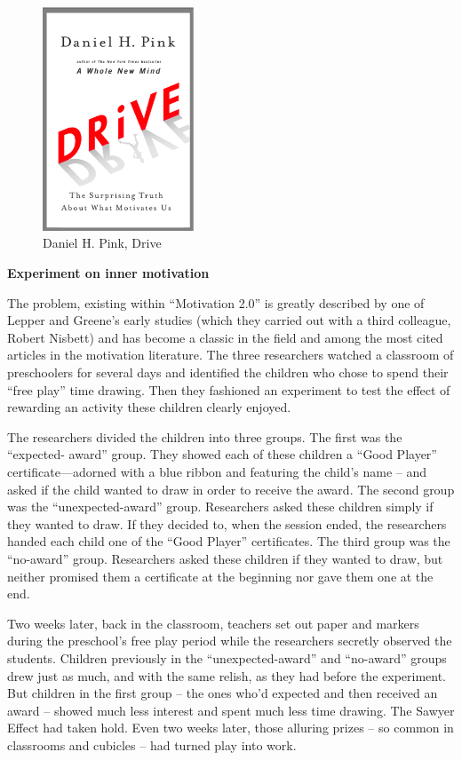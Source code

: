 \begin{figure}
    \centering
    \includegraphics[width=0.4\textwidth]{resources/drive.jpg}
    \caption[Daniel H. Pink, Drive]{Daniel H. Pink, Drive}
\end{figure}

\textbf{Experiment on inner motivation}

The problem, existing within ``Motivation 2.0'' is greatly described by one of Lepper and Greene’s early studies (which they carried out with a third colleague, Robert Nisbett) and has become a classic in the field and among the most cited articles in the motivation literature. The three researchers watched a classroom of preschoolers for several days and identified the children who chose to spend their ``free play'' time drawing. Then they fashioned an experiment to test the effect of rewarding an activity these children clearly enjoyed.

The researchers divided the children into three groups. The first was the ``expected- award'' group. They showed each of these children a ``Good Player'' certificate—adorned with a blue ribbon and featuring the child’s name -- and asked if the child wanted to draw in order to receive the award. The second group was the ``unexpected-award'' group. Researchers asked these children simply if they wanted to draw. If they decided to, when the session ended, the researchers handed each child one of the ``Good Player'' certificates. The third group was the ``no-award'' group. Researchers asked these children if they wanted to draw, but neither promised them a certificate at the beginning nor gave them one at the end.

Two weeks later, back in the classroom, teachers set out paper and markers during the preschool’s free play period while the researchers secretly observed the students. Children previously in the ``unexpected-award'' and ``no-award'' groups drew just as much, and with the same relish, as they had before the experiment. But children in the first group -- the ones who’d expected and then received an award -- showed much less interest and spent much less time drawing. The Sawyer Effect had taken hold. Even two weeks later, those alluring prizes -- so common in classrooms and cubicles -- had turned play into work.

